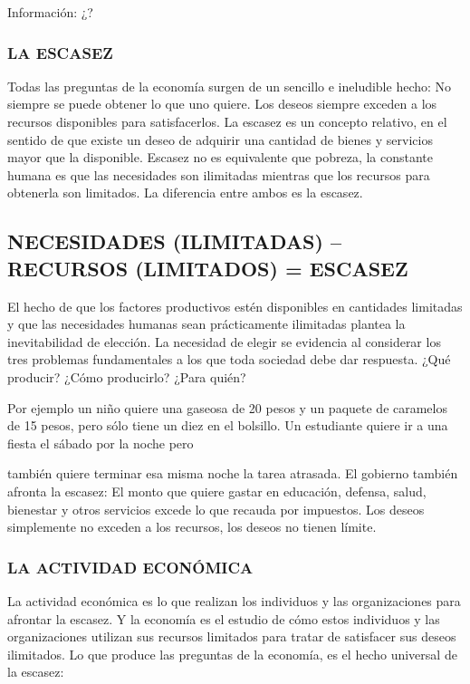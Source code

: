 Información: ¿?

\subsubsection*{LA ESCASEZ}
Todas las preguntas de la economía surgen de un sencillo e ineludible hecho: No siempre se puede obtener lo que uno quiere. Los deseos siempre exceden a los recursos disponibles para satisfacerlos. La escasez es un concepto relativo, en el sentido de que existe un deseo de adquirir una cantidad de bienes y servicios mayor que la disponible. Escasez no es equivalente que pobreza, la constante humana es que las necesidades son ilimitadas mientras que los recursos para obtenerla son limitados. La diferencia entre ambos es la escasez.

\subsection*{NECESIDADES (ILIMITADAS) – RECURSOS (LIMITADOS) = ESCASEZ}
El hecho de que los factores productivos estén disponibles en cantidades limitadas y que las necesidades humanas sean prácticamente ilimitadas plantea la inevitabilidad de elección. La necesidad de elegir se evidencia al considerar los tres problemas fundamentales a los que toda sociedad debe dar respuesta. ¿Qué producir? ¿Cómo producirlo? ¿Para quién?

Por ejemplo un niño quiere una gaseosa de 20 pesos y un paquete de caramelos de 15 pesos, pero sólo tiene un diez en el bolsillo. Un estudiante quiere ir a una fiesta el sábado por la noche pero



también quiere terminar esa misma noche la tarea atrasada. El gobierno también afronta la escasez: El monto que quiere gastar en educación, defensa, salud, bienestar y otros servicios excede lo que recauda por impuestos. Los deseos simplemente no exceden a los recursos, los deseos no tienen límite.

\subsubsection*{LA ACTIVIDAD ECONÓMICA}
La actividad económica es lo que realizan los individuos y las organizaciones para afrontar la escasez. Y la economía es el estudio de cómo estos individuos y las organizaciones utilizan sus recursos limitados para tratar de satisfacer sus deseos ilimitados. Lo que produce las preguntas de la economía, es el hecho universal de la escasez:

